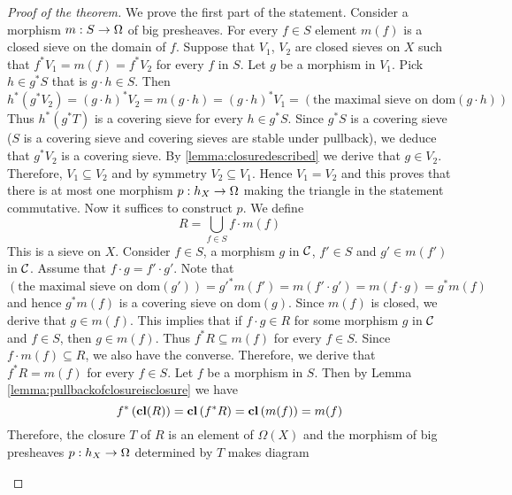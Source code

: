 \begin{proof}[Proof of the theorem]
We prove the first part of the statement. Consider a morphism $m:S\rightarrow \Omega$ of big presheaves. For every $f\in S$ element $m(f)$ is a closed sieve on the domain of $f$. Suppose that $V_1$, $V_2$ are closed sieves on $X$ such that $f^*V_1 = m(f) = f^*V_2$ for every $f$ in $S$. Let $g$ be a morphism in $V_1$. Pick $h\in g^*S$ that is $g\cdot h\in S$. Then
$$h^*\left(g^*V_2\right) = (g\cdot h)^*V_2 = m(g\cdot h) = (g\cdot h)^*V_1 = \left(\mbox{the maximal sieve on }\mathrm{dom}(g\cdot h)\right)$$
Thus $h^*\left(g^*T\right)$ is a covering sieve for every $h\in g^*S$. Since $g^*S$ is a covering sieve ($S$ is a covering sieve and covering sieves are stable under pullback), we deduce that $g^*V_2$ is a covering sieve. By \ref{lemma:closuredescribed} we derive that $g\in V_2$. Therefore, $V_1\subseteq V_2$ and by symmetry $V_2\subseteq V_1$. Hence $V_1 = V_2$ and this proves that there is at most one morphism $p:h_X\rightarrow \Omega$ making the triangle in the statement commutative. Now it suffices to construct $p$. We define
$$R = \bigcup_{f\in S}f\cdot m(f)$$
This is a  sieve on $X$. Consider $f \in S$, a morphism $g$ in ${\mathcal C}$, $f'\in S$ and $g'\in m(f')$ in ${\mathcal C}$. Assume that $f\cdot g = f'\cdot g'$. Note that
$$\left(\mbox{the maximal sieve on }\mathrm{dom}(g')\right) = g'^*m(f') = m(f'\cdot g') = m(f\cdot g) = g^*m(f) $$
and hence $g^*m(f)$ is a covering sieve on $\mathrm{dom}(g)$. Since $m(f)$ is closed, we derive that $g\in m(f)$. This implies that if $f\cdot g \in R$ for some morphism $g$ in ${\mathcal C}$ and $f\in S$, then $g\in m(f)$. Thus $f^*R\subseteq m(f)$ for every $f\in S$. Since $f\cdot m(f)\subseteq R$, we also have the converse. Therefore, we derive that $f^*R = m(f)$ for every $f\in S$. Let $f$ be a morphism in $S$. Then by Lemma \ref{lemma:pullbackofclosureisclosure} we have
$$f^*\left(\mathbf{cl}(R)\right) = \mathbf{cl}\left(f^*R\right) = \mathbf{cl}\left(m(f)\right) = m(f)$$
Therefore, the closure $T$ of $R$ is an element of $\Omega(X)$ and the morphism of big presheaves $p:h_X\rightarrow \Omega$ determined by $T$ makes diagram
\begin{center}
\end{center}
\end{proof}
